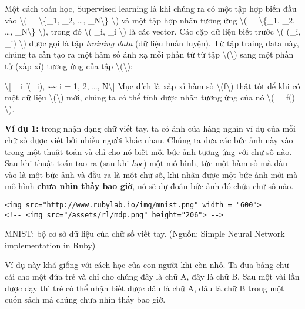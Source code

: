 Một cách toán học, Supervised learning là khi chúng ra có một tập hợp
biến đầu vào \textbackslash{}(  =
\textbackslash{}\{\_1, \_2, \dots,
\_N\textbackslash{}\} \textbackslash{}) và một tập hợp nhãn
tương ứng \textbackslash{}(  =
\textbackslash{}\{\_1, \_2, \dots,
\_N\textbackslash{}\} \textbackslash{}), trong đó
\textbackslash{}( \_i, \_i \textbackslash{}) là các
vector. Các cặp dữ liệu biết trước \textbackslash{}( (\_i,
\_i) \in {} \times {} \textbackslash{}) được
gọi là tập \emph{training data} (dữ liệu huấn luyện). Từ tập traing data
này, chúng ta cần tạo ra một hàm số ánh xạ mỗi phần tử từ tập
\textbackslash{}(\textbackslash{}) sang một phần tử (xấp xỉ)
tương ứng của tập \textbackslash{}(\textbackslash{}):

\textbackslash{}{[} \_i \approx f(\_i),
\textasciitilde{}\textasciitilde{} \forall i = 1, 2, \dots,
N\textbackslash{}{]} Mục đích là xấp xỉ hàm số
\textbackslash{}(f\textbackslash{}) thật tốt để khi có một dữ liệu
\textbackslash{}(\textbackslash{}) mới, chúng ta có thể tính
được nhãn tương ứng của nó \textbackslash{}(  = f()
\textbackslash{}).

\textbf{Ví dụ 1:} trong nhận dạng chữ viết tay, ta có ảnh của hàng nghìn
ví dụ của mỗi chữ số được viết bởi nhiều người khác nhau. Chúng ta đưa
các bức ảnh này vào trong một thuật toán và chỉ cho nó biết mỗi bức ảnh
tương ứng với chữ số nào. Sau khi thuật toán tạo ra (sau khi \emph{học})
một mô hình, tức một hàm số mà đầu vào là một bức ảnh và đầu ra là một
chữ số, khi nhận được một bức ảnh mới mà mô hình \textbf{chưa nhìn thấy
bao giờ}, nó sẽ dự đoán bức ảnh đó chứa chữ số nào.

\begin{verbatim}
<img src="http://www.rubylab.io/img/mnist.png" width = "600">
<!-- <img src="/assets/rl/mdp.png" height="206"> -->
\end{verbatim}

MNIST: bộ cơ sở dữ liệu của chữ số viết tay. (Nguồn: Simple Neural
Network implementation in Ruby)

Ví dụ này khá giống với cách học của con người khi còn nhỏ. Ta đưa bảng
chữ cái cho một đứa trẻ và chỉ cho chúng đây là chữ A, đây là chữ B. Sau
một vài lần được dạy thì trẻ có thể nhận biết được đâu là chữ A, đâu là
chữ B trong một cuốn sách mà chúng chưa nhìn thấy bao giờ.


